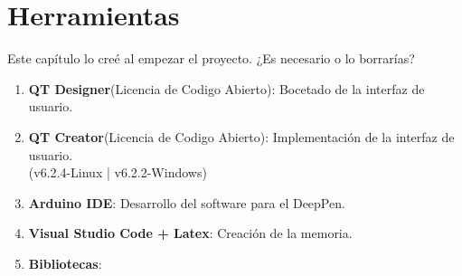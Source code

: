 \chapter{Herramientas}

\begin{mimargen}{-0.5cm}{-1.8cm}
    {\color{green}Este capítulo lo creé al empezar el proyecto. ¿Es necesario o lo
    borrarías?}\\
        
    \begin{enumerate}
        \item \textbf{QT Designer}({\tiny Licencia de Codigo Abierto}):
        Bocetado de la interfaz de usuario.
        \item \textbf{QT Creator}({\tiny Licencia de Codigo Abierto}):
        Implementación de la interfaz de usuario.\\
        (v6.2.4-Linux | v6.2.2-Windows)
        \item \textbf{Arduino IDE}: Desarrollo del software para el DeepPen.
        \item \textbf{Visual Studio Code + Latex}: Creación de la memoria.
        \item \textbf{Bibliotecas}:
    \end{enumerate}



\end{mimargen}